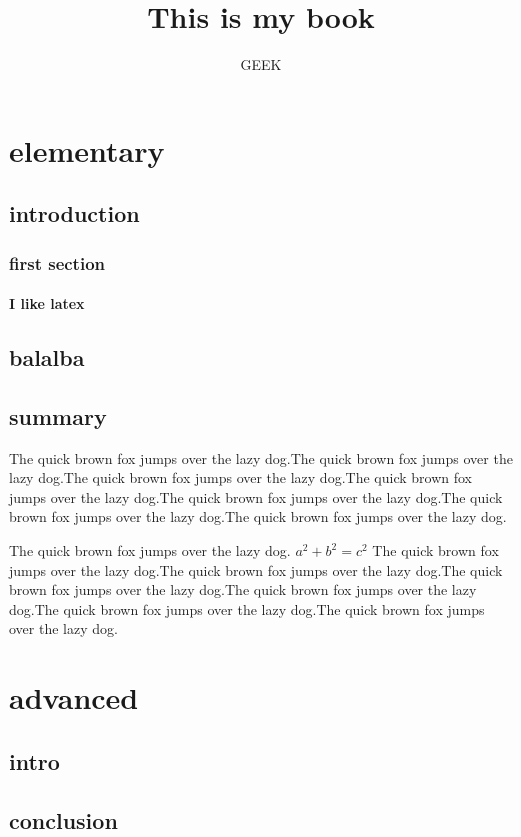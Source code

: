 \documentclass{book} %
\begin{document}

\title{This is my book}

\author{GEEK}

\date{}     %

\maketitle

\tableofcontents    %

\mainmatter     %

\part{elementary}

\chapter{introduction}
\section{first section}

\subsection{I like latex}

\chapter{balalba}

\chapter{summary}

The quick brown fox jumps over the lazy dog.The quick brown fox jumps over the lazy dog.The quick brown fox jumps over the lazy dog.The quick brown fox jumps over the lazy dog.The quick brown fox jumps over the lazy dog.The quick brown fox jumps over the lazy dog.The quick brown fox jumps over the lazy dog.

The quick brown fox jumps over the lazy dog. $a^2+b^2=c^2$ The quick brown fox jumps over the lazy dog.The quick brown fox jumps over the lazy dog.The quick brown fox jumps over the lazy dog.The quick brown fox jumps over the lazy dog.The quick brown fox jumps over the lazy dog.The quick brown fox jumps over the lazy dog.

\part{advanced}

\chapter{intro}

\chapter{conclusion}
\end{document}
